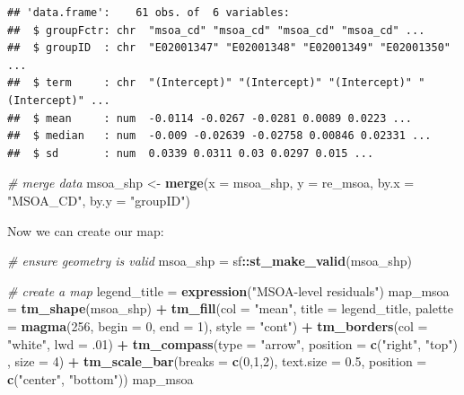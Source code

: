 \documentclass[
]{book}
\newenvironment{Shaded}{\begin{snugshade}}{\end{snugshade}}
\newcommand{\CommentTok}[1]{\textcolor[rgb]{0.56,0.35,0.01}{\textit{#1}}}
\newcommand{\DataTypeTok}[1]{\textcolor[rgb]{0.13,0.29,0.53}{#1}}
\newcommand{\DecValTok}[1]{\textcolor[rgb]{0.00,0.00,0.81}{#1}}
\newcommand{\FloatTok}[1]{\textcolor[rgb]{0.00,0.00,0.81}{#1}}
\newcommand{\KeywordTok}[1]{\textcolor[rgb]{0.13,0.29,0.53}{\textbf{#1}}}
\newcommand{\NormalTok}[1]{#1}
\newcommand{\OperatorTok}[1]{\textcolor[rgb]{0.81,0.36,0.00}{\textbf{#1}}}
\newcommand{\StringTok}[1]{\textcolor[rgb]{0.31,0.60,0.02}{#1}}
\begin{document}
\begin{verbatim}
## 'data.frame':    61 obs. of  6 variables:
##  $ groupFctr: chr  "msoa_cd" "msoa_cd" "msoa_cd" "msoa_cd" ...
##  $ groupID  : chr  "E02001347" "E02001348" "E02001349" "E02001350" ...
##  $ term     : chr  "(Intercept)" "(Intercept)" "(Intercept)" "(Intercept)" ...
##  $ mean     : num  -0.0114 -0.0267 -0.0281 0.0089 0.0223 ...
##  $ median   : num  -0.009 -0.02639 -0.02758 0.00846 0.02331 ...
##  $ sd       : num  0.0339 0.0311 0.03 0.0297 0.015 ...
\end{verbatim}

\begin{Shaded}
\begin{Highlighting}[]
\CommentTok{# merge data}
\NormalTok{msoa_shp <-}\StringTok{ }\KeywordTok{merge}\NormalTok{(}\DataTypeTok{x =}\NormalTok{ msoa_shp, }\DataTypeTok{y =}\NormalTok{ re_msoa, }\DataTypeTok{by.x =} \StringTok{"MSOA_CD"}\NormalTok{, }\DataTypeTok{by.y =} \StringTok{"groupID"}\NormalTok{)}
\end{Highlighting}
\end{Shaded}

Now we can create our map:

\begin{Shaded}
\begin{Highlighting}[]
\CommentTok{# ensure geometry is valid}
\NormalTok{msoa_shp =}\StringTok{ }\NormalTok{sf}\OperatorTok{::}\KeywordTok{st_make_valid}\NormalTok{(msoa_shp)}

\CommentTok{# create a map}
\NormalTok{legend_title =}\StringTok{ }\KeywordTok{expression}\NormalTok{(}\StringTok{"MSOA-level residuals"}\NormalTok{)}
\NormalTok{map_msoa =}\StringTok{ }\KeywordTok{tm_shape}\NormalTok{(msoa_shp) }\OperatorTok{+}
\StringTok{  }\KeywordTok{tm_fill}\NormalTok{(}\DataTypeTok{col =} \StringTok{"mean"}\NormalTok{, }\DataTypeTok{title =}\NormalTok{ legend_title, }\DataTypeTok{palette =} \KeywordTok{magma}\NormalTok{(}\DecValTok{256}\NormalTok{, }\DataTypeTok{begin =} \DecValTok{0}\NormalTok{, }\DataTypeTok{end =} \DecValTok{1}\NormalTok{), }\DataTypeTok{style =} \StringTok{"cont"}\NormalTok{) }\OperatorTok{+}\StringTok{ }
\StringTok{  }\KeywordTok{tm_borders}\NormalTok{(}\DataTypeTok{col =} \StringTok{"white"}\NormalTok{, }\DataTypeTok{lwd =} \FloatTok{.01}\NormalTok{)  }\OperatorTok{+}\StringTok{ }
\StringTok{  }\KeywordTok{tm_compass}\NormalTok{(}\DataTypeTok{type =} \StringTok{"arrow"}\NormalTok{, }\DataTypeTok{position =} \KeywordTok{c}\NormalTok{(}\StringTok{"right"}\NormalTok{, }\StringTok{"top"}\NormalTok{) , }\DataTypeTok{size =} \DecValTok{4}\NormalTok{) }\OperatorTok{+}\StringTok{ }
\StringTok{  }\KeywordTok{tm_scale_bar}\NormalTok{(}\DataTypeTok{breaks =} \KeywordTok{c}\NormalTok{(}\DecValTok{0}\NormalTok{,}\DecValTok{1}\NormalTok{,}\DecValTok{2}\NormalTok{), }\DataTypeTok{text.size =} \FloatTok{0.5}\NormalTok{, }\DataTypeTok{position =}  \KeywordTok{c}\NormalTok{(}\StringTok{"center"}\NormalTok{, }\StringTok{"bottom"}\NormalTok{)) }
\NormalTok{map_msoa}
\end{Highlighting}
\end{Shaded}
\end{document}
